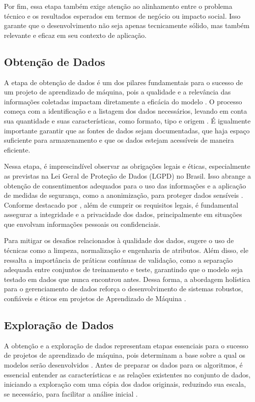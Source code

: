 Por fim, essa etapa também exige atenção ao alinhamento entre o problema técnico e os resultados esperados em termos de negócio ou impacto social. Isso garante que o desenvolvimento não seja apenas tecnicamente sólido, mas também relevante e eficaz em seu contexto de aplicação.

\subsection{Obtenção de Dados}
A etapa de obtenção de dados é um dos pilares fundamentais para o sucesso de um projeto de aprendizado de máquina, pois a qualidade e a relevância das informações coletadas impactam diretamente a eficácia do modelo \cite{geron2017}. O processo começa com a identificação e a listagem dos dados necessários, levando em conta sua quantidade e suas características, como formato, tipo e origem \cite{geron2017}. É igualmente importante garantir que as fontes de dados sejam documentadas, que haja espaço suficiente para armazenamento e que os dados estejam acessíveis de maneira eficiente.

Nessa etapa, é imprescindível observar as obrigações legais e éticas, especialmente as previstas na Lei Geral de Proteção de Dados (LGPD) no Brasil. Isso abrange a obtenção de consentimentos adequados para o uso das informações e a aplicação de medidas de segurança, como a anonimização, para proteger dados sensíveis \cite{muller2017}. Conforme destacado por , além de cumprir os requisitos legais, é fundamental assegurar a integridade e a privacidade dos dados, principalmente em situações que envolvam informações pessoais ou confidenciais.

Para mitigar os desafios relacionados à qualidade dos dados,  sugere o uso de técnicas como a limpeza, normalização e engenharia de atributos. Além disso, ele ressalta a importância de práticas contínuas de validação, como a separação adequada entre conjuntos de treinamento e teste, garantindo que o modelo seja testado em dados que nunca encontrou antes. Dessa forma, a abordagem holística para o gerenciamento de dados reforça o desenvolvimento de sistemas robustos, confiáveis e éticos em projetos de Aprendizado de Máquina \cite{geron2017}.

\subsection{Exploração de Dados}
A obtenção e a exploração de dados representam etapas essenciais para o sucesso de projetos de aprendizado de máquina, pois determinam a base sobre a qual os modelos serão desenvolvidos \cite{geron2017}. Antes de preparar os dados para os algoritmos, é essencial entender as características e as relações existentes no conjunto de dados, iniciando a exploração com uma cópia dos dados originais, reduzindo sua escala, se necessário, para facilitar a análise inicial \cite{geron2017}.

